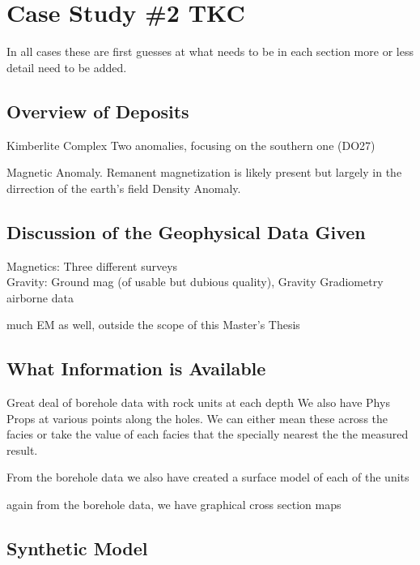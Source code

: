 
\chapter{Case Study \#2 TKC}
\label{ch:CaseStudy1}

In all cases these are first guesses at what needs to be in each section more or less detail need to be added.



\section{Overview of Deposits}
\label{sec:Overview of Deposits:TKC}

Kimberlite Complex
Two anomalies, focusing on the southern one (DO27)

Magnetic Anomaly. Remanent magnetization is likely present but largely in the dirrection of the earth's field
Density Anomaly. 
\section{Discussion of the Geophysical Data Given}
\label{sec:Discussion of the Geophysical Data Given:TKC}

Magnetics: Three different surveys\\
Gravity: Ground mag (of usable but dubious quality), Gravity Gradiometry airborne data

much EM as well, outside the scope of this Master's Thesis

\section{What Information is Available}
\label{sec:What Information is Available:TKC}

Great deal of borehole data with rock units at each depth
We also have Phys Props at various points along the holes. We can either mean these across the facies or take the value of each facies that the specially nearest the the measured result.

From the borehole data we also have created a surface model of each of the units

again from the borehole data, we have graphical cross section maps

\section{Synthetic Model}
\label{sec:Synthetic Model:TKC}

